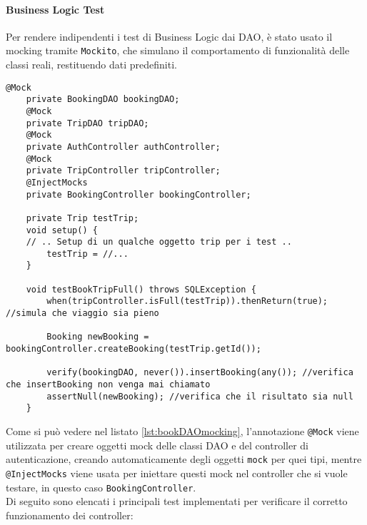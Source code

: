 \paragraph{Business Logic Test} \label{subsec:business-logic-test}
Per rendere indipendenti i test di Business Logic dai DAO, è stato usato il mocking tramite \texttt{Mockito}, che simulano il comportamento di funzionalità delle classi reali, restituendo dati predefiniti.\\
\begin{lstlisting}[style=java, caption={Esempio uso di mocking  in BookingControllerTest.}, label={lst:bookDAOmocking}]
    @Mock
    private BookingDAO bookingDAO;
    @Mock
    private TripDAO tripDAO;
    @Mock
    private AuthController authController;
    @Mock
    private TripController tripController;
    @InjectMocks
    private BookingController bookingController;
    
    private Trip testTrip;
    void setup() {
    // .. Setup di un qualche oggetto trip per i test ..
        testTrip = //...
    }
    
    void testBookTripFull() throws SQLException {
        when(tripController.isFull(testTrip)).thenReturn(true); //simula che viaggio sia pieno
        
        Booking newBooking = bookingController.createBooking(testTrip.getId());
        
        verify(bookingDAO, never()).insertBooking(any()); //verifica che insertBooking non venga mai chiamato
        assertNull(newBooking); //verifica che il risultato sia null
    }
\end{lstlisting}
Come si può vedere nel listato \ref{lst:bookDAOmocking}, l'annotazione \texttt{@Mock} viene utilizzata per creare oggetti mock delle classi DAO e del controller di autenticazione, creando automaticamente degli oggetti \texttt{mock} per quei tipi, mentre \texttt{@InjectMocks} viene usata per iniettare questi mock nel controller che si vuole testare, in questo caso \texttt{BookingController}.\\
Di seguito sono elencati i principali test implementati per verificare il corretto funzionamento dei controller:
